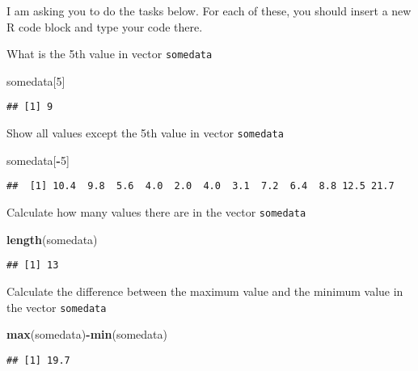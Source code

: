 \documentclass[]{article}
\newenvironment{Shaded}{\begin{snugshade}}{\end{snugshade}}
\newcommand{\KeywordTok}[1]{\textcolor[rgb]{0.13,0.29,0.53}{\textbf{#1}}}
\newcommand{\DecValTok}[1]{\textcolor[rgb]{0.00,0.00,0.81}{#1}}
\newcommand{\OperatorTok}[1]{\textcolor[rgb]{0.81,0.36,0.00}{\textbf{#1}}}
\newcommand{\NormalTok}[1]{#1}
\begin{document}
I am asking you to do the tasks below. For each of these, you should
insert a new R code block and type your code there.

What is the 5th value in vector \texttt{somedata}

\begin{Shaded}
\begin{Highlighting}[]
\NormalTok{somedata[}\DecValTok{5}\NormalTok{]}
\end{Highlighting}
\end{Shaded}

\begin{verbatim}
## [1] 9
\end{verbatim}

Show all values except the 5th value in vector \texttt{somedata}

\begin{Shaded}
\begin{Highlighting}[]
\NormalTok{somedata[}\OperatorTok{-}\DecValTok{5}\NormalTok{]}
\end{Highlighting}
\end{Shaded}

\begin{verbatim}
##  [1] 10.4  9.8  5.6  4.0  2.0  4.0  3.1  7.2  6.4  8.8 12.5 21.7
\end{verbatim}

Calculate how many values there are in the vector \texttt{somedata}

\begin{Shaded}
\begin{Highlighting}[]
\KeywordTok{length}\NormalTok{(somedata)}
\end{Highlighting}
\end{Shaded}

\begin{verbatim}
## [1] 13
\end{verbatim}

Calculate the difference between the maximum value and the minimum value
in the vector \texttt{somedata}

\begin{Shaded}
\begin{Highlighting}[]
\KeywordTok{max}\NormalTok{(somedata)}\OperatorTok{-}\KeywordTok{min}\NormalTok{(somedata)}
\end{Highlighting}
\end{Shaded}

\begin{verbatim}
## [1] 19.7
\end{verbatim}
\end{document}
